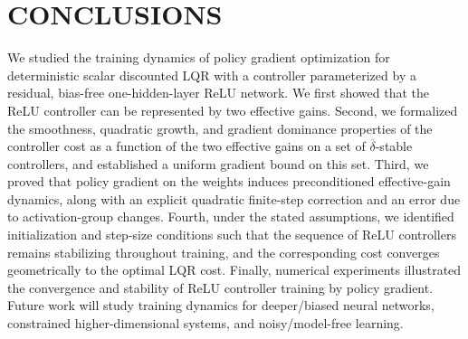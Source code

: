 \documentclass[letterpaper, 10 pt, conference]{ieeeconf}
\begin{document}
\section{CONCLUSIONS}
\label{section_conclusions}

We studied the training dynamics of policy gradient optimization for deterministic scalar discounted LQR with a controller parameterized by a residual, bias-free one-hidden-layer ReLU network. We first showed that the ReLU controller can be represented by two effective gains. Second, we formalized the smoothness, quadratic growth, and gradient dominance properties of the controller cost as a function of the two effective gains on a set of $\overline{\delta}$-stable controllers, and established a uniform gradient bound on this set. Third, we proved that policy gradient on the weights induces preconditioned effective-gain dynamics, along with an explicit quadratic finite-step correction and an error due to activation-group changes. Fourth, under the stated assumptions, we identified initialization and step-size conditions such that the sequence of ReLU controllers remains stabilizing throughout training, and the corresponding cost converges geometrically to the optimal LQR cost. Finally, numerical experiments illustrated the convergence and stability of ReLU controller training by policy gradient. Future work will study training dynamics for deeper/biased neural networks, constrained higher-dimensional systems, and noisy/model-free learning. 



\end{document}
